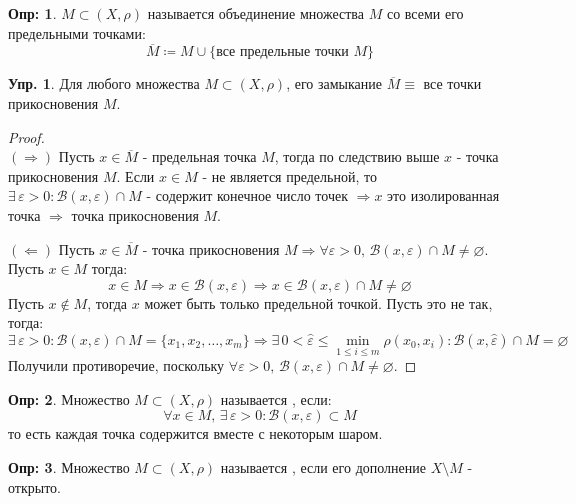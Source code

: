 \documentclass[12pt]{article}
\newcommand{\MB}{\mathcal{B}}
\newcommand{\VN}{\varnothing}
\newcommand{\VE}{\varepsilon}
\theoremstyle{definition}
\newtheorem{defn}{Опр:}
\newtheorem{exrc}{Упр.}
\newcommand{\ovl}[1]{\overline{#1}}
\begin{document}
\begin{defn}
	 $M \subset (X,\rho)$ называется объединение множества $M$ со всеми его предельными точками:
	$$
		\ovl{M} \coloneqq M\cup \{\text{все предельные точки } M\}
	$$
\end{defn}
\begin{exrc}
	Для любого множества $M\subset (X,\rho)$, его замыкание $\ovl{M} \equiv$ все точки прикосновения $M$. 
\end{exrc}
\begin{proof}\hfill\\
	$(\Rightarrow)$ Пусть $x \in \ovl{M}$ - предельная точка $M$, тогда по следствию выше $x$ - точка прикосновения $M$. Если $x \in M$ - не является предельной, то $\exists \, \VE > 0 \colon \MB(x,\VE) \cap M$ - содержит конечное число точек $\Rightarrow x$ это изолированная точка $\Rightarrow$ точка прикосновения $M$.
	
	$(\Leftarrow)$ Пусть $x \in \ovl{M}$ - точка прикосновения $M \Rightarrow \forall \VE > 0, \, \MB(x,\VE)\cap M \neq\VN$. Пусть $x \in M$ тогда:
	$$
		x \in M \Rightarrow x \in \MB(x,\VE) \Rightarrow x \in \MB(x,\VE)\cap M \neq \VN
	$$
	Пусть $x \not\in M$, тогда $x$ может быть только предельной точкой. Пусть это не так, тогда:
	$$
		\exists \, \VE > 0 \colon \MB(x,\VE) \cap M = \{x_1,x_2,\dotsc,x_m\} \Rightarrow \exists \, 0 < \hat{\VE} \leq \min\limits_{1 \leq i \leq m}\rho(x_0,x_i) \colon \MB(x,\hat{\VE}) \cap M = \VN
	$$
	Получили противоречие, поскольку $ \forall \VE > 0, \, \MB(x,\VE)\cap M \neq\VN$.
\end{proof}
\begin{defn}
	Множество $M \subset (X,\rho)$ называется , если: 
	$$
		\forall x \in M, \, \exists\, \VE > 0 \colon \MB(x,\VE) \subset M
	$$ 
	то есть каждая точка содержится вместе с некоторым шаром.
\end{defn}
\begin{defn}
	Множество $M \subset (X,\rho)$ называется , если его дополнение $X \setminus M$ - открыто.
\end{defn}
\end{document}
